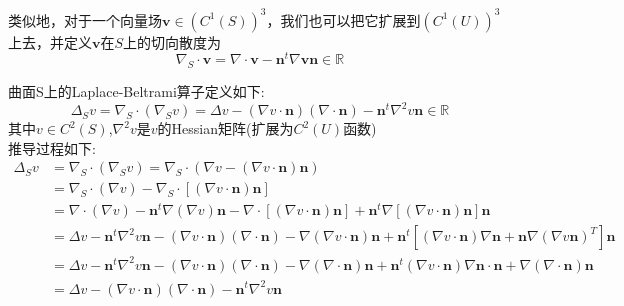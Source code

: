 类似地，对于一个向量场$\boldsymbol{v}\in(C^1(S))^3$，我们也可以把它扩展到$(C^1(U))^3$上去，并定义$\boldsymbol{v}$在$S$上的切向散度为
\begin{equation}
\nabla_S\cdot\boldsymbol{v}=\nabla\cdot\boldsymbol{v}-\boldsymbol{n}^t\nabla\boldsymbol{v}\boldsymbol{n}\in\mathbb{R}
\end{equation}

曲面S上的Laplace-Beltrami算子定义如下:
\begin{equation}
\Delta_Sv=\nabla_S\cdot(\nabla_Sv)=\Delta v-(\nabla v\cdot\boldsymbol{n})(\nabla\cdot\boldsymbol{n})-\boldsymbol{n}^t\nabla^2v\boldsymbol{n}\in\mathbb{R}
\end{equation}
其中$v\in C^2(S)$,$\nabla^2v$是$v$的Hessian矩阵(扩展为$C^2(U)$函数)\\
推导过程如下:
\begin{equation*}
\begin{aligned}
\Delta_Sv&=\nabla_S\cdot(\nabla_Sv)=\nabla_S\cdot(\nabla v-(\nabla v\cdot\boldsymbol{n})\boldsymbol{n})\\
&=\nabla_S\cdot(\nabla v)-\nabla_S\cdot[(\nabla v\cdot\boldsymbol{n})\boldsymbol{n}]\\
&=\nabla\cdot(\nabla v)-\boldsymbol{n}^t\nabla(\nabla v)\boldsymbol{n}-\nabla\cdot[(\nabla v\cdot\boldsymbol{n})\boldsymbol{n}]+\boldsymbol{n}^t\nabla[(\nabla v\cdot\boldsymbol{n})\boldsymbol{n}]\boldsymbol{n}\\
&=\Delta v-\boldsymbol{n}^t\nabla^2v\boldsymbol{n}-(\nabla v\cdot\boldsymbol{n})(\nabla\cdot\boldsymbol{n})-\nabla(\nabla v\cdot\boldsymbol{n})\boldsymbol{n}+\boldsymbol{n}^t[(\nabla v\cdot\boldsymbol{n})\nabla\boldsymbol{n}+\boldsymbol{n}\nabla(\nabla v\boldsymbol{n})^T]\boldsymbol{n}\\
&=\Delta v-\boldsymbol{n}^t\nabla^2v\boldsymbol{n}-(\nabla v\cdot\boldsymbol{n})(\nabla\cdot\boldsymbol{n})-\nabla(\nabla\cdot\boldsymbol{n})\boldsymbol{n}+\boldsymbol{n}^t(\nabla v\cdot\boldsymbol{n})\nabla\boldsymbol{n}\cdot\boldsymbol{n}+\nabla(\nabla\cdot\boldsymbol{n})\boldsymbol{n}\\
&=\Delta v-(\nabla v\cdot\boldsymbol{n})(\nabla\cdot\boldsymbol{n})-\boldsymbol{n}^t\nabla^2v\boldsymbol{n}
\end{aligned}
\end{equation*}

